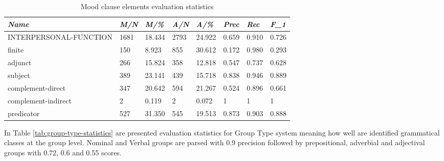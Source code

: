 \begin{table}[H]
    \centering
    \begin{tabulary}{\linewidth}{|L|l|l|l|l|l|l|l|}
        \hline
        \textit{Name}          & \textit{M/N} & \textit{M/\%} & \textit{A/N} & \textit{A/\%} & \textit{Prec} & \textit{Rec} & \textit{F_{1}} \\ \hline
        INTERPERSONAL-FUNCTION & 1681       & 18.434          & 2793        & 24.922           & 0.659              & 0.910           & 0.726       \\ \hline
        finite                 & 150        & 8.923           & 855         & 30.612           & 0.172              & 0.980           & 0.293       \\ \hline
        adjunct                & 266        & 15.824          & 358         & 12.818           & 0.547              & 0.737           & 0.628       \\ \hline
        subject                & 389        & 23.141          & 439         & 15.718           & 0.838              & 0.946           & 0.889       \\ \hline
        complement-direct      & 347        & 20.642          & 594         & 21.267           & 0.524              & 0.896           & 0.661       \\ \hline
        complement-indirect    & 2          & 0.119           & 2           & 0.072            & 1              & 1           & 1      \\ \hline
        predicator             & 527        & 31.350          & 545         & 19.513           & 0.873              & 0.903           & 0.888       \\ \hline
    \end{tabulary}
    \caption{Mood clause elements evaluation statistics}
    \label{tab:interpersonal-statistics}
\end{table}

In Table \ref{tab:group-type-statistics} are presented evaluation statistics for Group Type system meaning how well are identified grammatical classes at the group level. Nominal and Verbal groups are parsed with 0.9 precision followed by prepositional, adverbial and adjectival groups with 0.72, 0.6 and 0.55 scores.


